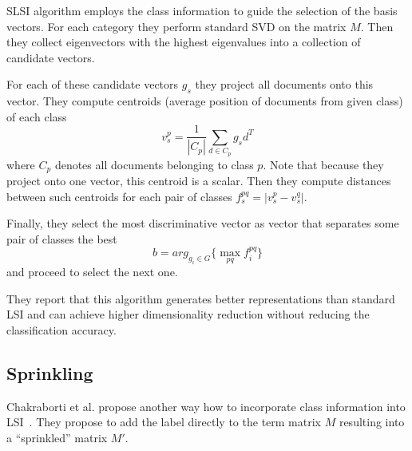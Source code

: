         SLSI algorithm employs the class information to guide the selection of the basis vectors. 
        For each category they perform standard SVD on the matrix $M$.
        Then they collect eigenvectors with the highest eigenvalues into a collection of candidate vectors.
        
        For each of these candidate vectors $g_s$ they project all documents onto this vector.
        They compute centroids (average position of documents from given class) of each class 
        \begin{equation}
        v_s^p = \frac{1}{|C_p|}\sum_{d\in C_p} g_s d^T
        \end{equation}
        where $C_p$ denotes all documents belonging to class $p$.
        Note that because they project onto one vector, this centroid is a scalar. 
        Then they compute distances between such centroids for each pair of classes $f_s^{pq} = |v_s^p - v_s^q|$.
        
        Finally, they select the most discriminative vector as vector that separates some pair of classes the best 
        \begin{equation}
        b=arg_{g_i \in G} \{\max_{p q} f_i^{p q} \}
        \end{equation}
        and proceed to select the next one.
        
        They report that this algorithm generates better representations than standard LSI and can achieve higher dimensionality reduction without reducing the classification accuracy.
        
    \subsection{Sprinkling}
        Chakraborti et al. propose another way how to incorporate class information into LSI~\cite{chakraborti2006sprinkling}\cite{chakraborti2007supervised}.
        They propose to add the label directly to the term matrix $M$ resulting into a ``sprinkled'' matrix $M'$.


